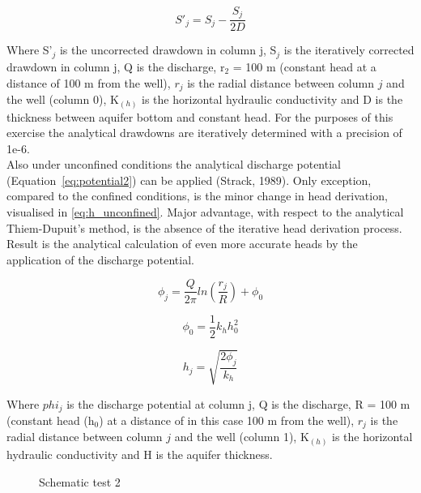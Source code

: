 \begin{equation}
 S'_j = S_j- \frac{S_j}{2D}  
 \label{eq:thiem_unconfined_corrected}
 \end{equation} 
 
Where S'$_j$ is the uncorrected drawdown in column j, S$_j$ is the iteratively corrected drawdown in column j, Q is the discharge, r$_2$ = 100 m (constant head at a distance of 100 m from the well), $r_j$ is the radial distance between column $j$ and the well (column 0), K$_{(h)}$ is the horizontal hydraulic conductivity and D is the thickness between aquifer bottom and constant head. For the purposes of this exercise the analytical drawdowns are iteratively determined with a precision of 1e-6. \\    

Also under unconfined conditions the analytical discharge potential (Equation~\ref{eq:potential2}) can be applied (Strack, 1989). Only exception, compared to the confined conditions, is the minor change in head derivation, visualised in \ref{eq:h_unconfined}. Major advantage, with respect to the analytical Thiem-Dupuit's method, is the absence of the iterative head derivation process. Result is the analytical calculation of even more accurate heads by the application of the discharge potential. 

\begin{equation}
 \phi_j = \frac{Q}{2\pi} ln(\frac{r_j}{R}) + \phi_0
 \label{eq:potential2}
\end{equation}  

\begin{equation}
 \phi_0 = \frac{1}{2}k_{h}h_0^{2}
 \label{eq:pot_unconfined}
\end{equation}  
 
\begin{equation}
 h_j = \sqrt{\frac{2\phi_j}{k_{h}}}
 \label{eq:h_unconfined}
\end{equation}  

Where $phi_j$ is the discharge potential at column j, Q is the discharge, R = 100 m (constant head (h$_0$) at a distance of in this case 100 m from the well), $r_j$ is the radial distance between column $j$ and the well (column 1), K$_{(h)}$ is the horizontal hydraulic conductivity and H is the aquifer thickness.\\

\begin{figure}[h]
\centering
{}
\captionsetup{justification=centering}
\caption{Schematic test 2}
\label{fig:Schematictest2}
\end{figure}

